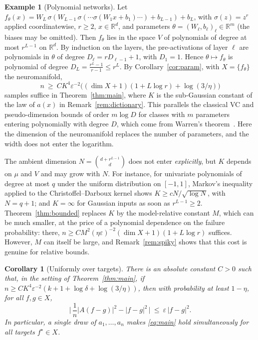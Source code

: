 \documentclass[11pt]{article}
\newtheorem{corollary}[theorem]{Corollary}
\theoremstyle{definition}
\newtheorem{example}[theorem]{Example}
\numberwithin{equation}{section}
\newcommand{\R}{\mathbb{R}}
\newcommand{\eps}{\varepsilon}
\newcommand{\fs}{f^{\star}}
\begin{document}
\begin{example}[Polynomial networks]\label{ex:nets}
Let $f_\theta(x)=W_L\,\sigma(W_{L-1}\,\sigma(\cdots\sigma(W_1x+b_1)\cdots)+b_{L-1})+b_L$, with $\sigma(z)=z^r$ applied coordinatewise, $r\ge2$, $x\in\R^d$, and parameters $\theta=(W_\ell,b_\ell)_\ell\in\R^m$ (the biases may be omitted). Then $f_\theta$ lies in the space $V$ of polynomials of degree at most $r^{L-1}$ on $\R^d$. By induction on the layers, the pre-activations of layer $\ell$ are polynomials in $\theta$ of degree $D_\ell=rD_{\ell-1}+1$, with $D_1=1$. Hence $\theta\mapsto f_\theta$ is polynomial of degree $D_L=\frac{r^L-1}{r-1}\le r^L$. By Corollary~\ref{cor:param}, with $X=\{f_\theta\}$ the neuromanifold,
\[
n\ \ge\ C K^4\eps^{-2}\big((\dim X+1)(1+L\log r)+\log(3/\eta)\big)
\]
samples suffice in Theorem~\ref{thm:main}, where $K$ is the sub-Gaussian constant of the law of $a(x)$ in Remark~\ref{rem:dictionary}. This parallels the classical VC and pseudo-dimension bounds of order $m\log D$ for classes with $m$ parameters entering polynomially with degree $D$, which come from Warren's theorem~\cite{Warren,GoldbergJerrum}. Here the dimension of the neuromanifold replaces the number of parameters, and the width does not enter the logarithm.

The ambient dimension $N=\binom{d+r^{L-1}}{d}$ does not enter \emph{explicitly}, but $K$ depends on $\mu$ and $V$ and may grow with $N$. For instance, for univariate polynomials of degree at most $q$ under the uniform distribution on $[-1,1]$, Markov's inequality applied to the Christoffel--Darboux kernel shows $K\ge cN/\sqrt{\log N}$, with $N=q+1$; and $K=\infty$ for Gaussian inputs as soon as $r^{L-1}\ge2$. Theorem~\ref{thm:bounded} replaces $K$ by the model-relative constant $M$, which can be much smaller, at the price of a polynomial dependence on the failure probability: there, $n\ge CM^2(\eta\eps)^{-2}(\dim X+1)(1+L\log r)$ suffices. However, $M$ can itself be large, and Remark~\ref{rem:spiky} shows that this cost is genuine for relative bounds.
\end{example}

\begin{corollary}[Uniformly over targets]\label{cor:uniform}
There is an absolute constant $C>0$ such that, in the setting of Theorem~\ref{thm:main}, if $n\ge CK^4\eps^{-2}(k+1+\log\delta+\log(3/\eta))$, then with probability at least $1-\eta$, for all $f,g\in X$,
\[
\Big|\,\frac1n|A(f-g)|^2-|f-g|^2\,\Big|\ \le\ \eps\,|f-g|^2 .
\]
In particular, a single draw of $a_1,\dots,a_n$ makes \eqref{eq:main} hold simultaneously for all targets $\fs\in X$.
\end{corollary}
\end{document}
